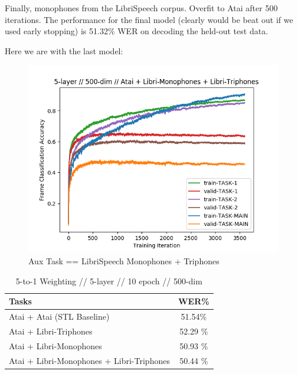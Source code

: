 \documentclass[a4paper]{article}
\begin{document}
Finally, monophones from the LibriSpeech corpus. Overfit to Atai after 500 iterations. The performance for the final model (clearly would be beat out if we used early stopping) is 51.32\% WER on decoding the held-out test data.



Here we are with the last model:


\begin{figure}[!htb]
  \centering
{}
  \includegraphics[width=\linewidth]{figs/atai-libritriphones-librimonophones.png}
  \caption{Aux Task == LibriSpeech Monophones + Triphones}
\endminipage\hfill
\end{figure}






\begin{table}[!htbp]
  \centering
    \caption{5-to-1 Weighting // 5-layer // 10 epoch // 500-dim}
  \begin{adjustbox}{width=.45\textwidth}
    \begin{tabular}{lc}
      \toprule
      \textbf{Tasks} & \textbf{WER\%}\\
      \midrule
      Atai + Atai (STL Baseline) &  51.54\% \\
      Atai + Libri-Triphones & 52.29 \%  \\
      Atai + Libri-Monophones & 50.93 \% \\
      Atai + Libri-Monophones + Libri-Triphones & 50.44 \%  \\
      \bottomrule
    \end{tabular}
    \label{table:data}
  \end{adjustbox}
\end{table}
\end{document}
